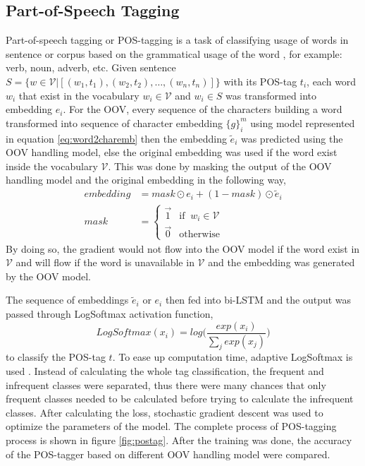     \subsection{Part-of-Speech Tagging}
        Part-of-speech tagging or POS-tagging is a task of classifying
        usage of words in sentence or corpus based on the grammatical
        usage of the word \citep{robustpostag2018horsmann}, for
        example: verb, noun, adverb, etc. Given sentence $S = \{w \in
        \mathcal{V} \vert [(w_1, t_1), (w_2, t_2), \dots, (w_n,
        t_n)]\}$ with its POS-tag $t_i$, each word $w_i$ that exist in
        the vocabulary $w_i \in \mathcal{V}$ and $w_i \in S$ was
        transformed into embedding $e_i$. For the OOV, every sequence
        of the characters building a word transformed into sequence of
        character embedding $\{g\}_{i}^m$ using model represented in
        equation \ref{eq:word2charemb} then the embedding
        $\tilde{e}_i$ was predicted using the OOV handling model, else
        the original embedding was used if the word exist inside the
        vocabulary $\mathcal{V}$. This was done by masking the output
        of the OOV handling model and the original embedding in the
        following way,
        \begin{align}
            \label{eq:embeddingmask}
            embedding &= mask \odot e_i + (1-mask) \odot \tilde{e}_i\\
            mask &=
            \begin{cases}
                \vec{1} & \text{if }\ w_i \in \mathcal{V}\\
                \vec{0} & \text{otherwise}
            \end{cases}
        \end{align}        
        By doing so, the gradient would not flow into the OOV model if
        the word exist in $\mathcal{V}$ and will flow if the word is
        unavailable in $\mathcal{V}$ and the embedding was generated
        by the OOV model.

        The sequence of embeddings $\tilde{e}_i$ or $e_i$ then fed
        into bi-LSTM and the output was passed through LogSoftmax
        activation function,
        \begin{equation}
            \label{eq:logsoftmax}
            LogSoftmax(x_i) = log \Bigg(\frac{exp(x_i)}{\sum_j exp(x_j)}\Bigg)
        \end{equation}
        to classify the POS-tag $t$. To ease up computation time,
        adaptive LogSoftmax is used \citep{grave2018efficientsoftmax}.
        Instead of calculating the whole tag classification, the
        frequent and infrequent classes were separated, thus there were
        many chances that only frequent classes needed to be calculated
        before trying to calculate the infrequent classes. After
        calculating the loss, stochastic gradient descent was used to
        optimize the parameters of the model. The complete process of
        POS-tagging process is shown in figure \ref{fig:postag}. After
        the training was done, the accuracy of the POS-tagger based on
        different OOV handling model were compared.

